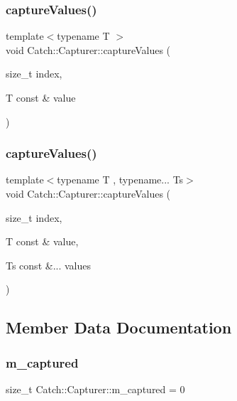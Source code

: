 \subsubsection{captureValues()\hspace{0.1cm}{\footnotesize\ttfamily [1/2]}}
{\footnotesize\ttfamily template$<$typename T $>$ \\
void Catch\+::\+Capturer\+::capture\+Values (\begin{DoxyParamCaption}\item[{size\+\_\+t}]{index,  }\item[{T const \&}]{value }\end{DoxyParamCaption})\hspace{0.3cm}{\ttfamily [inline]}}

\mbox{\label{class_catch_1_1_capturer_a76f2a097cfeb3042688300b81eb9bcbc}} 
\subsubsection{captureValues()\hspace{0.1cm}{\footnotesize\ttfamily [2/2]}}
{\footnotesize\ttfamily template$<$typename T , typename... Ts$>$ \\
void Catch\+::\+Capturer\+::capture\+Values (\begin{DoxyParamCaption}\item[{size\+\_\+t}]{index,  }\item[{T const \&}]{value,  }\item[{Ts const \&...}]{values }\end{DoxyParamCaption})\hspace{0.3cm}{\ttfamily [inline]}}



\subsection{Member Data Documentation}
\mbox{\label{class_catch_1_1_capturer_a1c3bea0fde97a7663ece4b81187fa9ed}} 
\subsubsection{m\_captured}
{\footnotesize\ttfamily size\+\_\+t Catch\+::\+Capturer\+::m\+\_\+captured = 0\hspace{0.3cm}{\ttfamily [private]}}

